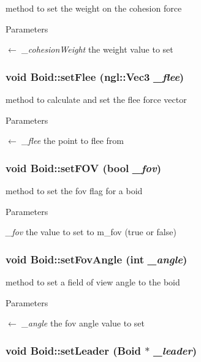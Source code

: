 method to set the weight on the cohesion force 
\begin{DoxyParams}{Parameters}
\item[\mbox{$\leftarrow$} {\em \_\-cohesionWeight}]the weight value to set \end{DoxyParams}
\hypertarget{classBoid_ac918331f40a49e19bcf13ee56e91d2b0}{
\subsubsection[{setFlee}]{\setlength{\rightskip}{0pt plus 5cm}void Boid::setFlee (ngl::Vec3 {\em \_\-flee})}}
\label{classBoid_ac918331f40a49e19bcf13ee56e91d2b0}


method to calculate and set the flee force vector 
\begin{DoxyParams}{Parameters}
\item[\mbox{$\leftarrow$} {\em \_\-flee}]the point to flee from \end{DoxyParams}
\hypertarget{classBoid_a3043cc98a80c99cc2af2e8961089390d}{
\subsubsection[{setFOV}]{\setlength{\rightskip}{0pt plus 5cm}void Boid::setFOV (bool {\em \_\-fov})}}
\label{classBoid_a3043cc98a80c99cc2af2e8961089390d}


method to set the fov flag for a boid 
\begin{DoxyParams}{Parameters}
\item[{\em \_\-fov}]the value to set to m\_\-fov (true or false) \end{DoxyParams}
\hypertarget{classBoid_a40bc1ac10a4e2769ee315f7adfd39147}{
\subsubsection[{setFovAngle}]{\setlength{\rightskip}{0pt plus 5cm}void Boid::setFovAngle (int {\em \_\-angle})}}
\label{classBoid_a40bc1ac10a4e2769ee315f7adfd39147}


method to set a field of view angle to the boid 
\begin{DoxyParams}{Parameters}
\item[\mbox{$\leftarrow$} {\em \_\-angle}]the fov angle value to set \end{DoxyParams}
\hypertarget{classBoid_ab850962513064089effde9640a90eda5}{
\subsubsection[{setLeader}]{\setlength{\rightskip}{0pt plus 5cm}void Boid::setLeader ({\bf Boid} $\ast$ {\em \_\-leader})}}
\label{classBoid_ab850962513064089effde9640a90eda5}


